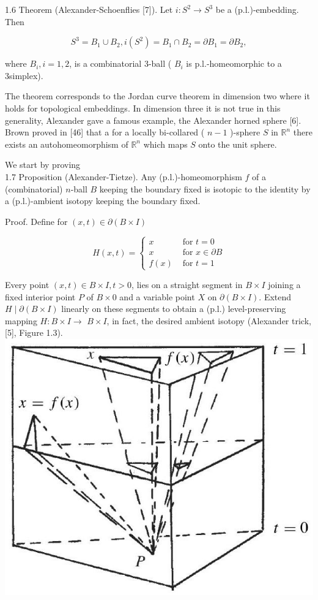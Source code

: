 \documentclass[10pt, letterpaper]{article}
\begin{document}
1.6 Theorem (Alexander-Schoenflies [7]). Let $i: S^{2} \rightarrow S^{3}$ be a (p.l.)-embedding. Then

$$
S^{3}=B_{1} \cup B_{2}, i\left(S^{2}\right)=B_{1} \cap B_{2}=\partial B_{1}=\partial B_{2},
$$

where $B_{i}, i=1,2$, is a combinatorial 3-ball ( $B_{i}$ is p.l.-homeomorphic to a 3simplex).

The theorem corresponds to the Jordan curve theorem in dimension two where it holds for topological embeddings. In dimension three it is not true in this generality, Alexander gave a famous example, the Alexander horned sphere [6]. Brown proved in [46] that a for a locally bi-collared ( $n-1$ )-sphere $S$ in $\mathbb{R}^{n}$ there exists an autohomeomorphism of $\mathbb{R}^{n}$ which maps $S$ onto the unit sphere.

We start by proving\\

1.7 Proposition (Alexander-Tietze). Any (p.l.)-homeomorphism $f$ of a (combinatorial) $n$-ball $B$ keeping the boundary fixed is isotopic to the identity by a (p.l.)-ambient isotopy keeping the boundary fixed.

Proof. Define for $(x, t) \in \partial(B \times I)$

$$
H(x, t)= \begin{cases}x & \text { for } t=0 \\ x & \text { for } x \in \partial B \\ f(x) & \text { for } t=1\end{cases}
$$

Every point $(x, t) \in B \times I, t>0$, lies on a straight segment in $B \times I$ joining a fixed interior point $P$ of $B \times 0$ and a variable point $X$ on $\partial(B \times I)$. Extend $H \mid \partial(B \times I)$ linearly on these segments to obtain a (p.l.) level-preserving mapping $H: B \times I \rightarrow$ $B \times I$, in fact, the desired ambient isotopy (Alexander trick, [5], Figure 1.3).\\
\includegraphics[scale=0.2, center]{2025_05_21_9c06be8de7a55410f8c1g-019}
\end{document}
